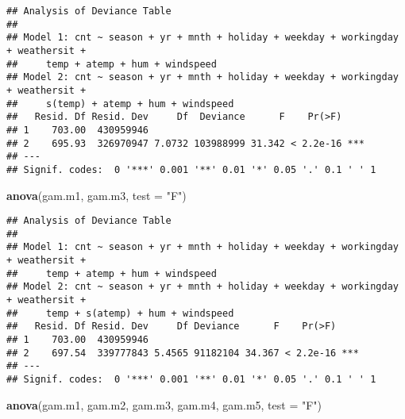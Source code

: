 \documentclass[]{article}
\newenvironment{Shaded}{\begin{snugshade}}{\end{snugshade}}
\newcommand{\KeywordTok}[1]{\textcolor[rgb]{0.13,0.29,0.53}{\textbf{#1}}}
\newcommand{\DataTypeTok}[1]{\textcolor[rgb]{0.13,0.29,0.53}{#1}}
\newcommand{\StringTok}[1]{\textcolor[rgb]{0.31,0.60,0.02}{#1}}
\newcommand{\NormalTok}[1]{#1}
\begin{document}
\begin{verbatim}
## Analysis of Deviance Table
## 
## Model 1: cnt ~ season + yr + mnth + holiday + weekday + workingday + weathersit + 
##     temp + atemp + hum + windspeed
## Model 2: cnt ~ season + yr + mnth + holiday + weekday + workingday + weathersit + 
##     s(temp) + atemp + hum + windspeed
##   Resid. Df Resid. Dev     Df  Deviance      F    Pr(>F)    
## 1    703.00  430959946                                      
## 2    695.93  326970947 7.0732 103988999 31.342 < 2.2e-16 ***
## ---
## Signif. codes:  0 '***' 0.001 '**' 0.01 '*' 0.05 '.' 0.1 ' ' 1
\end{verbatim}

\begin{Shaded}
\begin{Highlighting}[]
\KeywordTok{anova}\NormalTok{(gam.m1, gam.m3, }\DataTypeTok{test =} \StringTok{"F"}\NormalTok{)  }
\end{Highlighting}
\end{Shaded}

\begin{verbatim}
## Analysis of Deviance Table
## 
## Model 1: cnt ~ season + yr + mnth + holiday + weekday + workingday + weathersit + 
##     temp + atemp + hum + windspeed
## Model 2: cnt ~ season + yr + mnth + holiday + weekday + workingday + weathersit + 
##     temp + s(atemp) + hum + windspeed
##   Resid. Df Resid. Dev     Df Deviance      F    Pr(>F)    
## 1    703.00  430959946                                     
## 2    697.54  339777843 5.4565 91182104 34.367 < 2.2e-16 ***
## ---
## Signif. codes:  0 '***' 0.001 '**' 0.01 '*' 0.05 '.' 0.1 ' ' 1
\end{verbatim}

\begin{Shaded}
\begin{Highlighting}[]
\KeywordTok{anova}\NormalTok{(gam.m1, gam.m2, gam.m3, gam.m4, gam.m5, }\DataTypeTok{test =} \StringTok{"F"}\NormalTok{)}
\end{Highlighting}
\end{Shaded}
\end{document}
